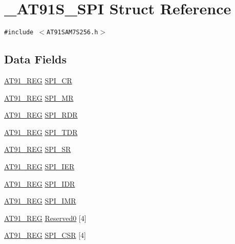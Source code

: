 \hypertarget{struct__AT91S__SPI}{
\section{\_\-AT91S\_\-SPI Struct Reference}
\label{struct__AT91S__SPI}
}
{\tt \#include $<$AT91SAM7S256.h$>$}

\subsection*{Data Fields}
\begin{CompactItemize}
\item 
\hyperlink{AT91SAM7X256_8h_712ad5a1ac1bd02f3e95a7526c283ce1}{AT91\_\-REG} \hyperlink{struct__AT91S__SPI_5d6553c05d0a9468b53a3521e9dc2d03}{SPI\_\-CR}
\item 
\hyperlink{AT91SAM7X256_8h_712ad5a1ac1bd02f3e95a7526c283ce1}{AT91\_\-REG} \hyperlink{struct__AT91S__SPI_53c8dfe2e423e8032df8655ea1c55ae3}{SPI\_\-MR}
\item 
\hyperlink{AT91SAM7X256_8h_712ad5a1ac1bd02f3e95a7526c283ce1}{AT91\_\-REG} \hyperlink{struct__AT91S__SPI_2e4e0521afa48de31a6c6ab7b395a1b4}{SPI\_\-RDR}
\item 
\hyperlink{AT91SAM7X256_8h_712ad5a1ac1bd02f3e95a7526c283ce1}{AT91\_\-REG} \hyperlink{struct__AT91S__SPI_11135c353bb5ac7311dbd52934205d6c}{SPI\_\-TDR}
\item 
\hyperlink{AT91SAM7X256_8h_712ad5a1ac1bd02f3e95a7526c283ce1}{AT91\_\-REG} \hyperlink{struct__AT91S__SPI_88f90286651b43730ca1e186224dd921}{SPI\_\-SR}
\item 
\hyperlink{AT91SAM7X256_8h_712ad5a1ac1bd02f3e95a7526c283ce1}{AT91\_\-REG} \hyperlink{struct__AT91S__SPI_789ac88d795620768b33e76cea5d7c15}{SPI\_\-IER}
\item 
\hyperlink{AT91SAM7X256_8h_712ad5a1ac1bd02f3e95a7526c283ce1}{AT91\_\-REG} \hyperlink{struct__AT91S__SPI_8b1413ef206fd57fcd3dbedaeebbb0a5}{SPI\_\-IDR}
\item 
\hyperlink{AT91SAM7X256_8h_712ad5a1ac1bd02f3e95a7526c283ce1}{AT91\_\-REG} \hyperlink{struct__AT91S__SPI_a276a1765641b516aafb1cd399aaca7f}{SPI\_\-IMR}
\item 
\hyperlink{AT91SAM7X256_8h_712ad5a1ac1bd02f3e95a7526c283ce1}{AT91\_\-REG} \hyperlink{struct__AT91S__SPI_1bb30be3714bf821c53f14301f302027}{Reserved0} \mbox{[}4\mbox{]}
\item 
\hyperlink{AT91SAM7X256_8h_712ad5a1ac1bd02f3e95a7526c283ce1}{AT91\_\-REG} \hyperlink{struct__AT91S__SPI_bbf4500576969ea8013cca841d0b1979}{SPI\_\-CSR} \mbox{[}4\mbox{]}

\end{CompactItemize}
